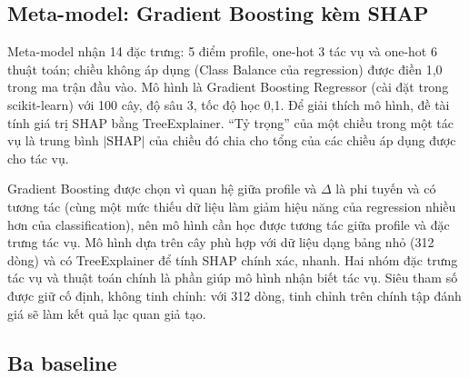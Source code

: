 \subsection{Meta-model: Gradient Boosting kèm SHAP}
\label{sec:metamodel}

Meta-model nhận 14 đặc trưng: 5 điểm profile, one-hot 3 tác vụ và one-hot 6 thuật toán; chiều không áp dụng (Class Balance của regression) được điền 1,0 trong ma trận đầu vào. Mô hình là Gradient Boosting Regressor \citep{friedman2001greedy} (cài đặt trong scikit-learn) với 100 cây, độ sâu 3, tốc độ học 0,1. Để giải thích mô hình, đề tài tính giá trị SHAP \citep{lundberg2017unified} bằng TreeExplainer. ``Tỷ trọng'' của một chiều trong một tác vụ là trung bình $|\text{SHAP}|$ của chiều đó chia cho tổng của các chiều áp dụng được cho tác vụ.

Gradient Boosting được chọn vì quan hệ giữa profile và $\Delta$ là phi tuyến và có tương tác (cùng một mức thiếu dữ liệu làm giảm hiệu năng của regression nhiều hơn của classification), nên mô hình cần học được tương tác giữa profile và đặc trưng tác vụ. Mô hình dựa trên cây phù hợp với dữ liệu dạng bảng nhỏ (312 dòng) và có TreeExplainer để tính SHAP chính xác, nhanh. Hai nhóm đặc trưng tác vụ và thuật toán chính là phần giúp mô hình nhận biết tác vụ. Siêu tham số được giữ cố định, không tinh chỉnh: với 312 dòng, tinh chỉnh trên chính tập đánh giá sẽ làm kết quả lạc quan giả tạo.

\subsection{Ba baseline}
\label{sec:baseline}

